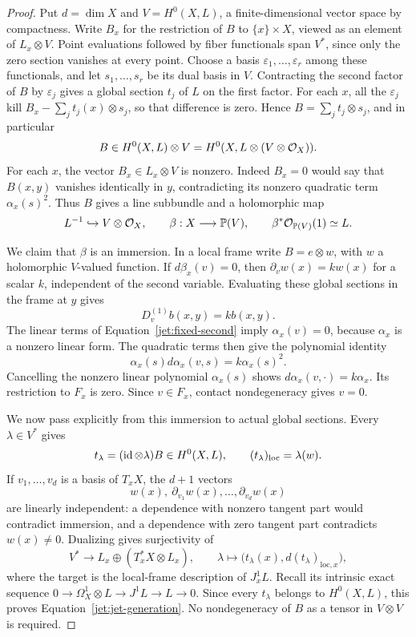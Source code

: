 \begin{proof}
Put $d=\dim X$ and $V=H^0(X,L)$, a finite-dimensional vector space
by compactness. Write $B_x$ for the restriction of $B$ to
$\{x\}\times X$, viewed as an element of $L_x\otimes V$.
Point evaluations followed by fiber functionals span $V^*$, since
only the zero section vanishes at every point. Choose a basis
$\varepsilon_1,\ldots,\varepsilon_r$ among these functionals, and let
$s_1,\ldots,s_r$ be its dual basis in $V$. Contracting the second
factor of $B$ by $\varepsilon_j$ gives a global section $t_j$ of $L$
on the first factor. For each $x$, all the $\varepsilon_j$ kill
$B_x-\sum_jt_j(x)\otimes s_j$, so that difference is zero. Hence
$B=\sum_jt_j\otimes s_j$, and in particular
\[
B\in H^0(X,L)\otimes V
=H^0(X,L\otimes(V\otimes\mathcal O_X)).
\]
For each $x$, the vector $B_x\in L_x\otimes V$ is nonzero.
Indeed $B_x=0$ would say that $B(x,y)$ vanishes identically in $y$,
contradicting its nonzero quadratic term $\alpha_x(s)^2$.
Thus $B$ gives a line subbundle and a holomorphic map
\begin{equation}\label{jet:beta}
L^{-1}\hookrightarrow V\otimes\mathcal O_X,
\qquad \beta:X\longrightarrow\mathbb P(V),
\qquad \beta^*\mathcal O_{\mathbb P(V)}(1)\simeq L.
\end{equation}

We claim that $\beta$ is an immersion. In a local frame write
$B=e\otimes w$, with $w$ a holomorphic $V$-valued function.
If $d\beta_x(v)=0$, then $\partial_vw(x)=k w(x)$ for a scalar
$k$, independent of the second variable. Evaluating these global
sections in the frame at $y$ gives
\begin{equation}\label{jet:kernel}
D^{(1)}_v b(x,y)=k b(x,y).
\end{equation}
The linear terms of Equation~\eqref{jet:fixed-second} imply
$\alpha_x(v)=0$, because $\alpha_x$ is a nonzero linear form.
The quadratic terms then give the polynomial identity
\[
\alpha_x(s)d\alpha_x(v,s)=k\alpha_x(s)^2.
\]
Cancelling the nonzero linear polynomial $\alpha_x(s)$ shows
$d\alpha_x(v,\cdot)=k\alpha_x$. Its restriction to $F_x$ is
zero. Since $v\in F_x$, contact nondegeneracy gives $v=0$.

We now pass explicitly from this immersion to actual global
sections. Every $\lambda\in V^*$ gives
\[
t_\lambda=(\operatorname{id}\otimes\lambda)B\in H^0(X,L),
\qquad (t_\lambda)_{\mathrm{loc}}=\lambda(w).
\]
If $v_1,\ldots,v_d$ is a basis of $T_xX$, the $d+1$ vectors
\[
w(x),\ \partial_{v_1}w(x),\ldots,\partial_{v_d}w(x)
\]
are linearly independent: a dependence with nonzero tangent part
would contradict immersion, and a dependence with zero tangent
part contradicts $w(x)\ne0$. Dualizing gives surjectivity of
\[
V^*\longrightarrow L_x\oplus(T_x^*X\otimes L_x),
\qquad
\lambda\longmapsto\bigl(t_\lambda(x),d(t_\lambda)_{\mathrm{loc},x}\bigr),
\]
where the target is the local-frame description of $J_x^1L$.
Recall its intrinsic exact sequence
$0\to\Omega_X^1\otimes L\to J^1L\to L\to0$.
Since every $t_\lambda$ belongs to $H^0(X,L)$, this proves
Equation~\eqref{jet:jet-generation}. No nondegeneracy of $B$ as
a tensor in $V\otimes V$ is required.


\end{proof}
